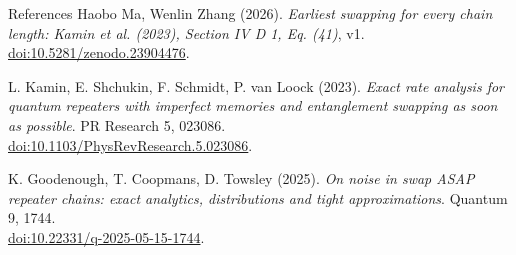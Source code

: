 \documentclass{beamer}
\begin{document}
\begin{frame}{References}
\small
Haobo Ma, Wenlin Zhang (2026). \emph{Earliest swapping for every chain length: Kamin et al. (2023), Section IV D 1, Eq. (41)}, v1.\\
\href{https://doi.org/10.5281/zenodo.23904476}{doi:10.5281/zenodo.23904476}.
\medskip

L. Kamin, E. Shchukin, F. Schmidt, P. van Loock (2023). \emph{Exact rate analysis for quantum repeaters with imperfect memories and entanglement swapping as soon as possible}. PR Research 5, 023086.\\
\href{https://doi.org/10.1103/PhysRevResearch.5.023086}{doi:10.1103/PhysRevResearch.5.023086}.
\medskip

K. Goodenough, T. Coopmans, D. Towsley (2025). \emph{On noise in swap ASAP repeater chains: exact analytics, distributions and tight approximations}. Quantum 9, 1744.\\
\href{https://doi.org/10.22331/q-2025-05-15-1744}{doi:10.22331/q-2025-05-15-1744}.
\end{frame}
\appendix
\end{document}
